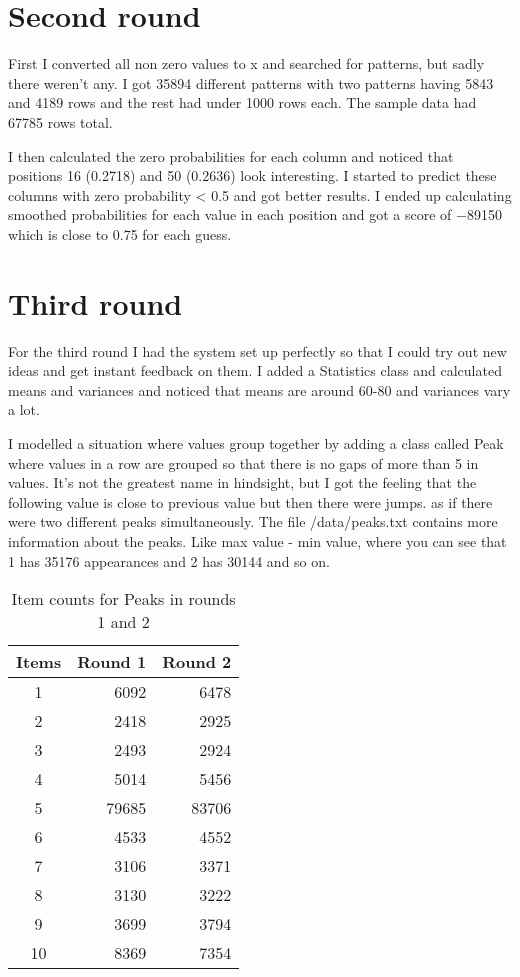 \documentclass[english,12pt]{tktltiki2}
\theoremstyle{definition}
\theoremstyle{remark}
\begin{document}
\section{Second round}

First I converted all non zero values to x and searched for patterns, but sadly there weren't any. I got \num{35894} different patterns with two patterns having 5843 and 4189 rows and the rest had under 1000 rows each. The sample data had \num{67785} rows total.

I then calculated the zero probabilities for each column and noticed that positions 16 (0.2718) and 50 (0.2636) look interesting. I started to predict these columns with zero probability < 0.5 and got better results. I ended up calculating smoothed probabilities for each value in each position and got a score of \num{-89150} which is close to 0.75 for each guess. 

\section{Third round}

For the third round I had the system set up perfectly so that I could try out new ideas and get instant feedback on them. I added a Statistics class and calculated means and variances and noticed that means are around 60-80 and variances vary a lot. 

I modelled a situation where values group together by adding a class called Peak where values in a row are grouped so that there is no gaps of more than 5 in values. It's not the greatest name in hindsight, but I got the feeling that the following value is close to previous value but then there were jumps. as if there were two different peaks simultaneously. The file /data/peaks.txt contains more information about the peaks. Like max value - min value, where you can see that 1 has \num{35176} appearances and 2 has \num{30144} and so on. 

\begin{wraptable}{r}{5cm}
\caption{Item counts for Peaks in rounds 1 and 2}\label{item_counts}
\begin{tabular}{c | r | r}
Items & Round 1 & Round 2 \\
\hline
1 & 6092 & 6478 \\
2 & 2418 & 2925 \\
3 & 2493 & 2924 \\
4 & 5014 & 5456 \\
5 & \num{79685} & \num{83706} \\
6 & 4533 & 4552 \\
7 & 3106 & 3371 \\
8 & 3130 & 3222 \\
9 & 3699 & 3794 \\
10 & 8369 & 7354
\end{tabular}
\end{wraptable}
\end{document}
